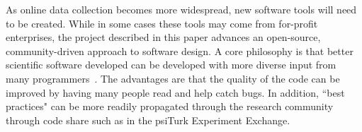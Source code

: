 \documentclass[twocolumn]{svjour3}          %
\begin{document}
As online data collection becomes more widespread, new software tools will need to be
created.  While in some cases these tools may come from for-profit enterprises, the project
described in this paper advances an open-source, community-driven approach to software
design.  A core philosophy is that better scientific software developed can be developed 
with more diverse input from many programmers~\citep{Raymond:1999zt}.
The advantages are that the quality of the code can be improved by having many people
read and help catch bugs.  In addition, ``best practices" can be more readily propagated
through the research community through code share such as in the \textsf{psiTurk}
Experiment Exchange. 



\end{document}
